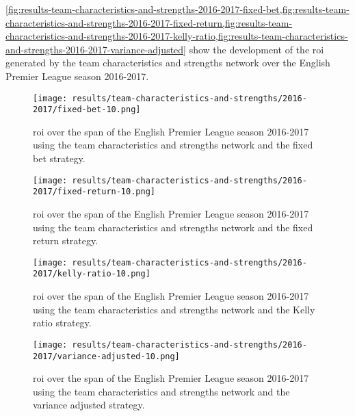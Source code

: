 \cref{fig:results-team-characteristics-and-strengths-2016-2017-fixed-bet,fig:results-team-characteristics-and-strengths-2016-2017-fixed-return,fig:results-team-characteristics-and-strengths-2016-2017-kelly-ratio,fig:results-team-characteristics-and-strengths-2016-2017-variance-adjusted} show the development of the \gls{roi} generated by the team characteristics and strengths network over the English Premier League season 2016-2017.
\begin{figure}
    \centering
    \texttt{[image: results/team-characteristics-and-strengths/2016-2017/fixed-bet-10.png]}
    \caption{\gls{roi} over the span of the English Premier League season 2016-2017 using the team characteristics and strengths network and the fixed bet strategy.}
    \label{fig:results-team-characteristics-and-strengths-2016-2017-fixed-bet}
\end{figure}
\begin{figure}
    \centering
    \texttt{[image: results/team-characteristics-and-strengths/2016-2017/fixed-return-10.png]}
    \caption{\gls{roi} over the span of the English Premier League season 2016-2017 using the team characteristics and strengths network and the fixed return strategy.}
    \label{fig:results-team-characteristics-and-strengths-2016-2017-fixed-return}
\end{figure}
\begin{figure}
    \centering
    \texttt{[image: results/team-characteristics-and-strengths/2016-2017/kelly-ratio-10.png]}
    \caption{\gls{roi} over the span of the English Premier League season 2016-2017 using the team characteristics and strengths network and the Kelly ratio strategy.}
    \label{fig:results-team-characteristics-and-strengths-2016-2017-kelly-ratio}
\end{figure}
\begin{figure}
    \centering
    \texttt{[image: results/team-characteristics-and-strengths/2016-2017/variance-adjusted-10.png]}
    \caption{\gls{roi} over the span of the English Premier League season 2016-2017 using the team characteristics and strengths network and the variance adjusted strategy.}
    \label{fig:results-team-characteristics-and-strengths-2016-2017-variance-adjusted}
\end{figure}

